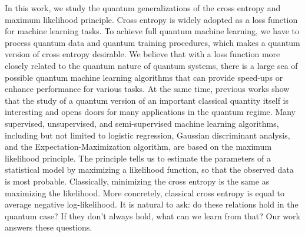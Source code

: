 \documentclass[11pt]{article}
\theoremstyle{definition}
\begin{document}
In this work, we study the quantum generalizations of the cross entropy and maximum likelihood principle. Cross entropy is widely adopted as a loss function for machine learning tasks. To achieve full quantum machine learning, we have to process quantum data and quantum training procedures, which makes a quantum version of cross entropy desirable. We believe that with a loss function more closely related to the quantum nature of quantum systems, there is a large sea of possible quantum machine learning algorithms that can provide speed-ups or enhance performance for various tasks. At the same time, previous works \cite{jozsa1994fidelity,petz2001entropy,relative1,relative2,casini2008relative,gu2010fidelity,muller2013renyi,jafferis2016relative, berta2017variational, shangnan2019complexity} show that the study of a quantum version of an important classical quantity itself is interesting and opens doors for many applications in the quantum regime.
Many supervised, unsupervised, and semi-supervised machine learning algorithms, including but not limited to logistic regression, Gaussian discriminant analysis, and the Expectation-Maximization algorithm, are based on the maximum likelihood principle. The principle tells us to estimate the parameters of a statistical model by maximizing a likelihood function, so that the observed data is most probable. 
Classically, minimizing the cross entropy is the same as maximizing the likelihood. More concretely, classical cross entropy is equal to average negative log-likelihood. It is natural to ask: do these relations hold in the quantum case? If they don't always hold, what can we learn from that? Our work answers these questions.
\end{document}
